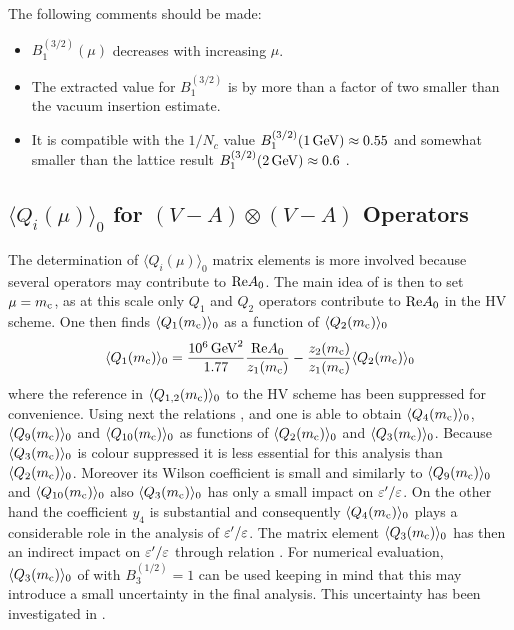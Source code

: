 \noindent
The following comments should be made:
\begin{itemize}
\item
$B_1^{(3/2)}(\mu)$ decreases with increasing $\mu$.
\item
The extracted value for $B_1^{(3/2)}$ is by more than a factor of two
smaller than the vacuum insertion estimate.
\item
It is compatible with the $1/N_c$ value $B_1^{(3/2)}(1\, {\rm GeV}) \approx
0.55$ \cite{bardeen:87b} and somewhat smaller than the lattice result
$B_1^{(3/2)}(2\, {\rm GeV}) \approx 0.6$ \cite{ciuchini:95}.
\end{itemize}

\subsection{$\langle Q_i(\mu) \rangle_0$ for $(V-A)\otimes (V-A)$ Operators}
           \label{subsec:Qi0VmAVmA}
The determination of $\langle Q_i(\mu) \rangle_0$ matrix elements is
more involved because several operators may contribute to ${\rm Re}
A_0$. The main idea of \cite{burasetal:92d} is then to set $\mu=m_{\rm c}$, as
at this scale only $Q_1$ and $Q_2$ operators contribute to ${\rm Re}
A_0$ in the HV scheme. One then finds $\langle Q_1(m_{\rm c}) \rangle_0$ as a
function of  $\langle Q_2(m_{\rm c}) \rangle_0$
\begin{equation}
\langle Q_1(m_{\rm c}) \rangle_0 = \frac{10^6\, {\rm GeV}^2}{1.77} \frac{{\rm Re}
A_0}{z_1(m_{\rm c})} - \frac{z_2(m_{\rm c})}{z_1(m_{\rm c})} \langle Q_2(m_{\rm c}) \rangle_0
\label{eq:Q10mc}
\end{equation}
where the reference in $\langle Q_{1,2}(m_{\rm c}) \rangle_0$ to the HV scheme
has been suppressed for convenience. Using next the relations
,  and  one is able to obtain
$\langle Q_4(m_{\rm c}) \rangle_0$, $\langle Q_9(m_{\rm c}) \rangle_0$ and $\langle
Q_{10}(m_{\rm c}) \rangle_0$ as functions of $\langle Q_2(m_{\rm c}) \rangle_0$ and
$\langle Q_3(m_{\rm c}) \rangle_0$. Because $\langle Q_3(m_{\rm c}) \rangle_0$ is
colour suppressed it is less essential for this analysis than $\langle
Q_2(m_{\rm c}) \rangle_0$. Moreover its Wilson coefficient is small and
similarly to $\langle Q_9(m_{\rm c}) \rangle_0$ and $\langle 
Q_{10}(m_{\rm c}) \rangle_0$ also $\langle Q_3(m_{\rm c}) \rangle_0$ has only a
small impact on $\varepsilon'/\varepsilon$. On the other hand the coefficient $y_4$ is
substantial and consequently $\langle Q_4(m_{\rm c}) \rangle_0$ plays a
considerable role in the analysis of $\varepsilon'/\varepsilon$. The matrix element $\langle
Q_3(m_{\rm c}) \rangle_0$ has then an indirect impact on $\varepsilon'/\varepsilon$ through
relation . For numerical evaluation, $\langle Q_3(m_{\rm c})
\rangle_0$ of  with $B_3^{(1/2)} = 1$ can be used keeping in
mind that this may introduce a small uncertainty in the final analysis.
This uncertainty has been investigated in \cite{burasetal:92d}.

